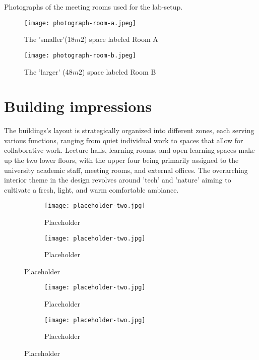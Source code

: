 \begin{appendices}
Photographs of the meeting rooms used for the lab-setup.

\begin{figure}[H]
\begin{minipage}{.5\textwidth}
    \centering
    \texttt{[image: photograph-room-a.jpeg]}
    \caption{The 'smaller'(18$m2$) space labeled Room A}
    \label{fig:timeline}
\end{minipage}%
\begin{minipage}{.5\textwidth}
    \centering
    \texttt{[image: photograph-room-b.jpeg]}
    \caption{The 'larger' (48$m2$) space labeled Room B}
    \label{fig:timeline}
\end{minipage}%
\end{figure}

\section{Building impressions}
\label{appendix:building}

The buildings's layout is strategically organized into different zones, each serving various functions, ranging from quiet individual work to spaces that allow for collaborative work. Lecture halls, learning rooms, and open learning spaces make up the two lower floors, with the upper four being primarily assigned to the university academic staff, meeting rooms, and external offices. The overarching interior theme in the design revolves around 'tech' and 'nature' aiming to cultivate a fresh, light, and warm comfortable ambiance. 

\begin{figure}[htbp]
    \centering
    \begin{subfigure}{0.48\textwidth}
        \centering
        \texttt{[image: placeholder-two.jpg]}
        \caption{Placeholder}
        \label{fig:image1}
    \end{subfigure}
    \hfill
    \begin{subfigure}{0.48\textwidth}
        \centering
        \texttt{[image: placeholder-two.jpg]}
        \caption{Placeholder}
        \label{fig:image2}
    \end{subfigure}
    \caption{Placeholder}
    \label{fig:grid}
\end{figure}

\begin{figure}[htbp]
    \centering
    \begin{subfigure}{0.48\textwidth}
        \centering
        \texttt{[image: placeholder-two.jpg]}
        \caption{Placeholder}
        \label{fig:image1}
    \end{subfigure}
    \hfill
    \begin{subfigure}{0.48\textwidth}
        \centering
        \texttt{[image: placeholder-two.jpg]}
        \caption{Placeholder}
        \label{fig:image2}
    \end{subfigure}
    \caption{Placeholder}
    \label{fig:grid}
\end{figure}


\end{appendices}
